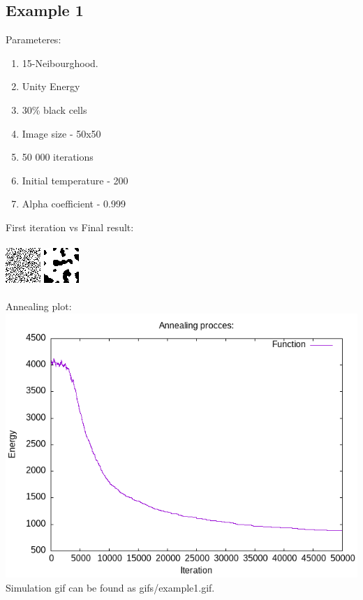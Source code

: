 \documentclass{article}
\begin{document}
\subsection*{Example 1}
Parameteres:
\begin{enumerate}
    \item 15-Neibourghood.
    \item Unity Energy
    \item 30\% black cells
    \item Image size - 50x50
    \item 50 000 iterations
    \item Initial temperature - 200
    \item Alpha coefficient - 0.999
\end{enumerate}
First iteration vs Final result:
\\\\
\includegraphics*[width = 0.4\linewidth ]{output/first/first_iter.png}
\includegraphics*[width = 0.4\linewidth ]{output/first/final_result.png}
\\\\
Annealing plot:
\\
\includegraphics*[width = 0.8\linewidth ]{output/first/annealing_plot.png}
\\
Simulation gif can be found as gifs/example1.gif. 
\end{document}

